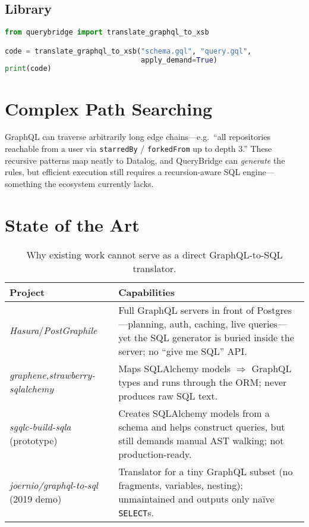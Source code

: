 \documentclass[11pt]{article}
\begin{document}
\subsection{Library}
\begin{lstlisting}[language=Python]
from querybridge import translate_graphql_to_xsb

code = translate_graphql_to_xsb("schema.gql", "query.gql",
                                apply_demand=True)
print(code)
\end{lstlisting}

\section{Complex Path Searching}
GraphQL can traverse arbitrarily long edge chains—e.g.\ “all repositories
reachable from a user via \texttt{starredBy} / \texttt{forkedFrom} up to depth 3.”
These recursive patterns map neatly to Datalog, and QueryBridge can
\emph{generate} the rules, but efficient execution still requires a
recursion-aware SQL engine—something the ecosystem currently lacks.

\section{State of the Art}
\begin{table}[h]
\centering
\renewcommand{\arraystretch}{1.2}
\begin{tabularx}{\textwidth}{@{}lX@{}}
\toprule
\textbf{Project} & \textbf{Capabilities} \\
\midrule
\emph{Hasura}/\emph{PostGraphile} &
Full GraphQL servers in front of Postgres—planning, auth, caching, live queries—yet the SQL generator is buried inside the server; no “give me SQL” API. \\ \addlinespace
\emph{{graphene,strawberry}-sqlalchemy} &
Maps SQLAlchemy models $\Rightarrow$ GraphQL types and runs through the ORM; never produces raw SQL text. \\ \addlinespace
\emph{sgqlc-build-sqla} (prototype) &
Creates SQLAlchemy models from a schema and helps construct queries, but still demands manual AST walking; not production-ready. \\ \addlinespace
\emph{joernio/graphql-to-sql} (2019 demo) &
Translator for a tiny GraphQL subset (no fragments, variables, nesting); unmaintained and outputs only naïve \texttt{SELECT}s. \\
\bottomrule
\end{tabularx}
\caption{Why existing work cannot serve as a direct GraphQL-to-SQL translator.}
\end{table}
\end{document}
